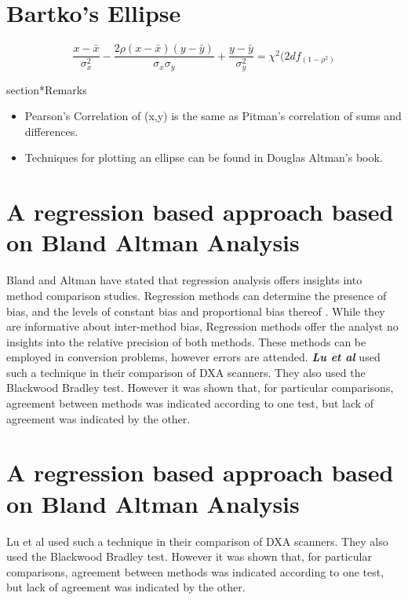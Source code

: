 \documentclass[12pt, a4paper]{report}
\theoremstyle{plain}
\theoremstyle{definition}
\theoremstyle{remark}
\begin{document}
\section*{Bartko's Ellipse}

\[ \frac{x - \bar{x}}{\sigma^2_x} - \frac{2\rho(x - \bar{x})(y - \bar{y})}{\sigma_x \sigma_y} + \frac{y - \bar{y}}{\sigma^2_y} = \chi^2(2df_(1-\rho^2) \]


section*{Remarks}
\begin{itemize}
	\item Pearson's Correlation of (x,y) is the same as Pitman's correlation of sums and differences.
	
	\item Techniques for plotting an ellipse can be found in Douglas Altman's book.
\end{itemize}
\newpage


\section{A regression based approach based on Bland Altman Analysis}
Bland and Altman have stated that regression analysis offers insights into method comparison studies. Regression methods can determine the presence of bias, and the levels of constant bias and proportional bias thereof \cite{ludbrook97,ludbrook02}.
While they are informative about inter-method bias, Regression methods offer the analyst no insights into the relative precision of both methods. These methods can be employed in conversion problems, however errors are
attended.
\emph{\textbf{Lu et al}} used such a technique in their comparison of DXA scanners. They also used the Blackwood Bradley test. However it was shown that, for particular comparisons, agreement between methods was indicated according to one test, but lack of agreement was indicated by the other.


\section{A regression based approach based on Bland Altman Analysis}
Lu et al used such a technique in their comparison of DXA
scanners. They also used the Blackwood Bradley test. However it
was shown that, for particular comparisons,  agreement between
methods was indicated according to one test, but lack of agreement
was indicated by the other.
\end{document}
